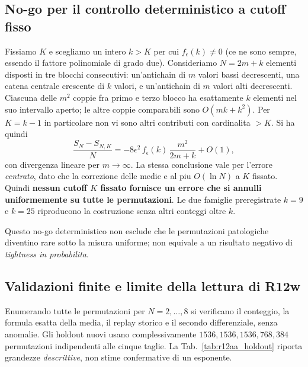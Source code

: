 \documentclass[11pt,a4paper]{article}
\begin{document}
\subsection{No-go per il controllo deterministico a cutoff fisso}

Fissiamo $K$ e scegliamo un intero $k>K$ per cui $f_\epsilon(k)\ne0$ (ce ne sono sempre, essendo il fattore polinomiale di grado due). Consideriamo $N=2m+k$ elementi disposti in tre blocchi consecutivi: un'antichain di $m$ valori bassi decrescenti, una catena centrale crescente di $k$ valori, e un'antichain di $m$ valori alti decrescenti. Ciascuna delle $m^2$ coppie fra primo e terzo blocco ha esattamente $k$ elementi nel suo intervallo aperto; le altre coppie comparabili sono $O(mk+k^2)$. Per $K=k-1$ in particolare non vi sono altri contributi con cardinalita $>K$. Si ha quindi
\begin{equation}
\frac{S_N-S_{N,K}}{N}
=-8\epsilon^2\,f_\epsilon(k)\,\frac{m^2}{2m+k}+O(1),
\label{eq:r12aa_fixed_K_obstruction}
\end{equation}
con divergenza lineare per $m\to\infty$. La stessa conclusione vale per l'errore \emph{centrato}, dato che la correzione delle medie e al piu $O(\ln N)$ a $K$ fissato. Quindi \textbf{nessun cutoff $K$ fissato fornisce un errore che si annulli uniformemente su tutte le permutazioni}. Le due famiglie preregistrate $k=9$ e $k=25$ riproducono la costruzione senza altri conteggi oltre $k$.

Questo no-go deterministico non esclude che le permutazioni patologiche diventino rare sotto la misura uniforme; non equivale a un risultato negativo di \emph{tightness in probabilita}.

\subsection{Validazioni finite e limite della lettura di R12w}

Enumerando tutte le permutazioni per $N=2,\ldots,8$ si verificano il conteggio, la formula esatta della media, il replay storico e il secondo differenziale, senza anomalie. Gli holdout nuovi usano complessivamente $1536,1536,1536,768,384$ permutazioni indipendenti alle cinque taglie. La Tab.~\ref{tab:r12aa_holdout} riporta grandezze \emph{descrittive}, non stime confermative di un esponente.
\end{document}

